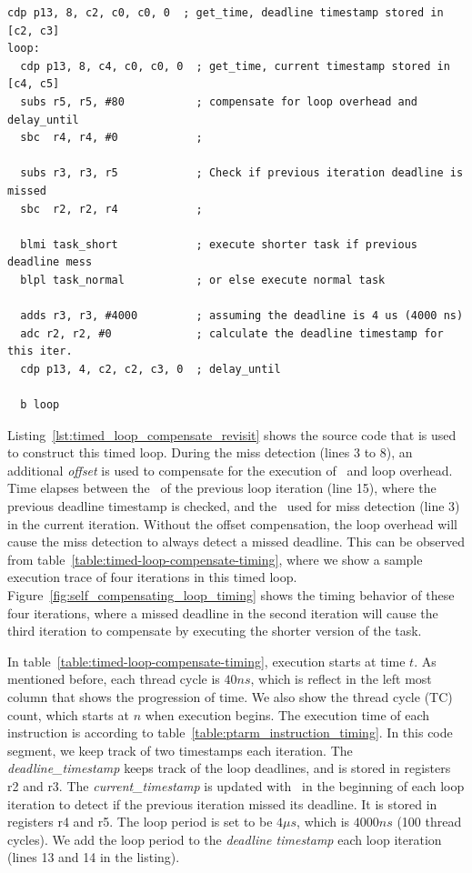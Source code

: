 \begin{lstlisting}[float=h, label=lst:timed_loop_compensate_revisit,caption=Timed loops with compensation revisited]
  cdp p13, 8, c2, c0, c0, 0  ; get_time, deadline timestamp stored in [c2, c3]
loop:
  cdp p13, 8, c4, c0, c0, 0  ; get_time, current timestamp stored in [c4, c5]
  subs r5, r5, #80           ; compensate for loop overhead and delay_until 
  sbc  r4, r4, #0            ; 

  subs r3, r3, r5            ; Check if previous iteration deadline is missed
  sbc  r2, r2, r4            ; 

  blmi task_short            ; execute shorter task if previous deadline mess 
  blpl task_normal           ; or else execute normal task 
  
  adds r3, r3, #4000         ; assuming the deadline is 4 us (4000 ns)
  adc r2, r2, #0             ; calculate the deadline timestamp for this iter.
  cdp p13, 4, c2, c2, c3, 0  ; delay_until
   
  b loop
\end{lstlisting}

Listing~\ref{lst:timed_loop_compensate_revisit} shows the source code that is used to construct this timed loop. 
During the miss detection (lines 3 to 8), an additional \textit{offset} is used to compensate for the execution of \delayuntil\ and loop overhead.
Time elapses between the \delayuntil\ of the previous loop iteration (line 15), where the previous deadline timestamp is checked, and the \gettime\ used for miss detection (line 3) in the current iteration.
Without the offset compensation, the loop overhead will cause the miss detection to always detect a missed deadline.
This can be observed from table~\ref{table:timed-loop-compensate-timing}, where we show a sample execution trace of four iterations in this timed loop.  
Figure~\ref{fig:self_compensating_loop_timing} shows the timing behavior of these four iterations, where a missed deadline in the second iteration will cause the third iteration to compensate by executing the shorter version of the task.

In table~\ref{table:timed-loop-compensate-timing}, execution starts at time $t$.
As mentioned before, each thread cycle is $40ns$, which is reflect in the left most column that shows the progression of time.
We also show the thread cycle (TC) count, which starts at $n$ when execution begins.
The execution time of each instruction is according to table~\ref{table:ptarm_instruction_timing}.
In this code segment, we keep track of two timestamps each iteration. 
The \emph{deadline\_timestamp} keeps track of the loop deadlines, and is stored in registers r2 and r3.  
The \emph{current\_timestamp} is updated with \gettime\ in the beginning of each loop iteration to detect if the previous iteration missed its deadline.
It is stored in registers r4 and r5. 
The loop period is set to be $4 \mu s$, which is $4000 ns$ (100 thread cycles).
We add the loop period to the \emph{deadline timestamp} each loop iteration (lines 13 and 14 in the listing).  

